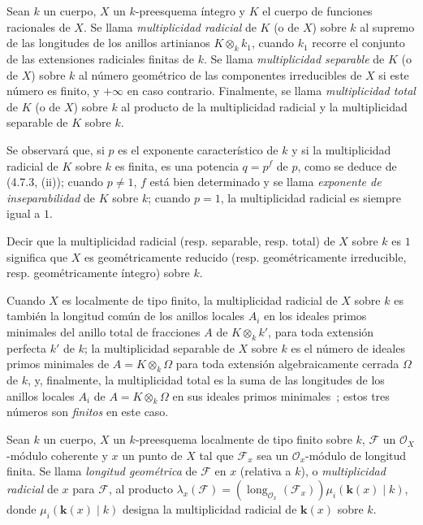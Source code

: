 \begin{definition}[4.7.4]
\label{IV.2.4.7.4-fr}
Sean $k$ un cuerpo, $X$ un $k$-preesquema íntegro y $K$ el cuerpo de funciones
racionales de $X$. Se llama \emph{multiplicidad radicial} de $K$
(o de $X$) sobre $k$ al supremo de las longitudes de los anillos artinianos
$K\otimes_k k_1$, cuando $k_1$ recorre el conjunto de las extensiones
radiciales finitas de $k$. Se llama \emph{multiplicidad separable} de $K$ (o de
$X$) sobre $k$ al número geométrico de las componentes irreducibles de $X$ si
este número es finito, y $+\infty$ en caso contrario. Finalmente, se llama
\emph{multiplicidad total} de $K$ (o de $X$) sobre $k$ al producto de la
multiplicidad radicial y la multiplicidad separable de $K$ sobre $k$.
\end{definition}

Se observará que, si $p$ es el exponente característico de $k$ y si la
multiplicidad radicial de $K$ sobre $k$ es finita, es una potencia $q=p^f$ de
$p$, como se deduce de (4.7.3, (ii)); cuando $p\ne1$, $f$ está bien determinado
y se llama \emph{exponente de inseparabilidad} de $K$ sobre $k$; cuando $p=1$,
la multiplicidad radicial es siempre igual a $1$.

Decir que la multiplicidad radicial (resp. separable, resp. total) de $X$ sobre
$k$ es $1$ significa que $X$ es geométricamente reducido (resp.
geométricamente irreducible, resp. geométricamente íntegro) sobre $k$.

Cuando $X$ es localmente de tipo finito, la multiplicidad radicial de $X$ sobre
$k$ es también la longitud común de los anillos locales $A_i$ en los ideales
primos minimales del anillo total de fracciones $A$ de $K\otimes_k k'$, para
toda extensión perfecta $k'$ de $k$; la multiplicidad separable de $X$ sobre
$k$ es el número de ideales primos minimales de $A=K\otimes_k\Omega$ para toda
extensión algebraicamente cerrada $\Omega$ de $k$, y, finalmente, la
multiplicidad total es la suma de las longitudes de los anillos locales $A_i$
de $A=K\otimes_k\Omega$ en sus ideales primos minimales~; estos tres números
son \emph{finitos} en este caso.

\begin{definition}[4.7.5]
\label{IV.2.4.7.5-fr}
Sean $k$ un cuerpo, $X$ un $k$-preesquema localmente de tipo finito sobre $k$,
$\mathscr F$ un $\mathcal O_X$-módulo coherente y $x$ un punto de $X$ tal que
$\mathscr F_x$ sea un $\mathcal O_x$-módulo de longitud finita. Se llama
\emph{longitud geométrica} de $\mathscr F$ en $x$ (relativa a $k$), o
\emph{multiplicidad radicial} de $x$ para $\mathscr F$, al producto
$\lambda_x(\mathscr F)
=(\operatorname{long}_{\mathcal O_x}(\mathscr F_x))\mu_i(\boldsymbol{k}(x)\mid k)$,
donde $\mu_i(\boldsymbol{k}(x)\mid k)$ designa la multiplicidad radicial de $\boldsymbol{k}(x)$ sobre
$k$.
\end{definition}


